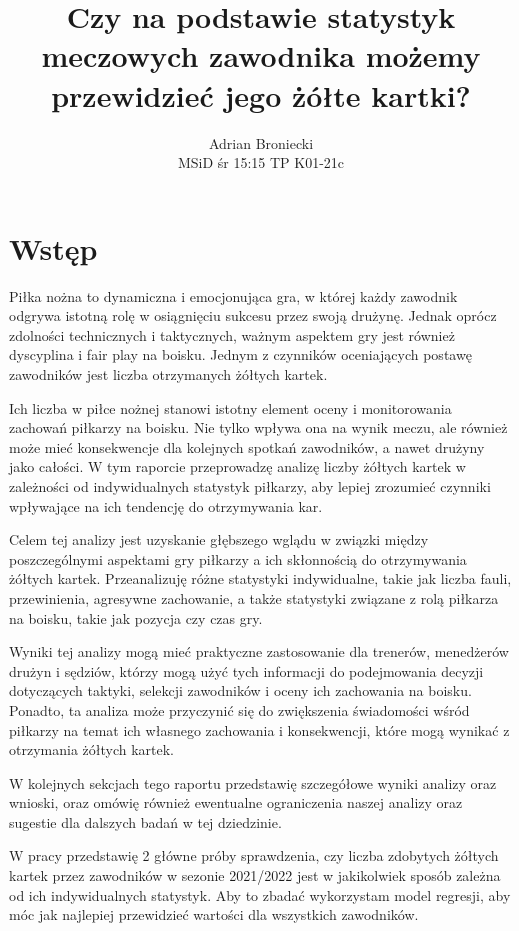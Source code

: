 \documentclass{article}
\title{Czy na podstawie statystyk meczowych zawodnika możemy przewidzieć jego żółte kartki?}
\author{Adrian Broniecki \\
\small MSiD śr 15:15 TP K01-21c
}
\begin{document}
\maketitle



\section{Wstęp}
Piłka nożna to dynamiczna i emocjonująca gra, w której każdy zawodnik odgrywa istotną rolę w osiągnięciu sukcesu przez swoją drużynę. Jednak oprócz zdolności technicznych i taktycznych, ważnym aspektem gry jest również dyscyplina i fair play na boisku. Jednym z czynników oceniających postawę zawodników jest liczba otrzymanych żółtych kartek.

Ich liczba w piłce nożnej stanowi istotny element oceny i monitorowania zachowań piłkarzy na boisku. Nie tylko wpływa ona na wynik meczu, ale również może mieć konsekwencje dla kolejnych spotkań zawodników, a nawet drużyny jako całości. W tym raporcie przeprowadzę analizę liczby żółtych kartek w zależności od indywidualnych statystyk piłkarzy, aby lepiej zrozumieć czynniki wpływające na ich tendencję do otrzymywania kar.

Celem tej analizy jest uzyskanie głębszego wglądu w związki między poszczególnymi aspektami gry piłkarzy a ich skłonnością do otrzymywania żółtych kartek. Przeanalizuję różne statystyki indywidualne, takie jak liczba fauli, przewinienia, agresywne zachowanie, a także statystyki związane z rolą piłkarza na boisku, takie jak pozycja czy czas gry.

Wyniki tej analizy mogą mieć praktyczne zastosowanie dla trenerów, menedżerów drużyn i sędziów, którzy mogą użyć tych informacji do podejmowania decyzji dotyczących taktyki, selekcji zawodników i oceny ich zachowania na boisku. Ponadto, ta analiza może przyczynić się do zwiększenia świadomości wśród piłkarzy na temat ich własnego zachowania i konsekwencji, które mogą wynikać z otrzymania żółtych kartek.

W kolejnych sekcjach tego raportu przedstawię szczegółowe wyniki analizy oraz wnioski, oraz omówię również ewentualne ograniczenia naszej analizy oraz sugestie dla dalszych badań w tej dziedzinie.

W pracy przedstawię 2 główne próby sprawdzenia, czy liczba zdobytych żółtych kartek przez zawodników w sezonie 2021/2022 jest w jakikolwiek sposób zależna od ich indywidualnych statystyk. Aby to zbadać wykorzystam model regresji, aby móc jak najlepiej przewidzieć wartości dla wszystkich zawodników.
\end{document}

